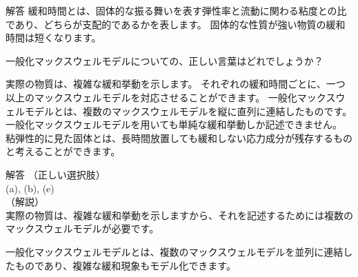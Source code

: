 \documentclass[uplatex,dvipdfmx,a4paper,11pt]{jsarticle}
\begin{document}
\begin{qlist}
\begin{itembox}[l]{解答}
			緩和時間とは、固体的な振る舞いを表す弾性率と流動に関わる粘度との比であり、どちらが支配的であるかを表します。
			固体的な性質が強い物質の緩和時間は短くなります。
        \end{itembox}
	\qitem 一般化マックスウェルモデルについての、正しい言葉はどれでしょうか？
		\begin{qlist2}
			\qitem 実際の物質は、複雑な緩和挙動を示します。
			\qitem それぞれの緩和時間ごとに、一つ以上のマックスウェルモデルを対応させることができます。
			\qitem 一般化マックスウェルモデルとは、複数のマックスウェルモデルを縦に直列に連結したものです。
			\qitem 一般化マックスウェルモデルを用いても単純な緩和挙動しか記述できません。
			\qitem 粘弾性的に見た固体とは、長時間放置しても緩和しない応力成分が残存するものと考えることができます。
		\end{qlist2}
		\vspace{3mm}
        \begin{itembox}[l]{解答}
            （正しい選択肢）\\
            (a), (b), (e)\\
            （解説）\\
            実際の物質は、複雑な緩和挙動を示しますから、それを記述するためには複数のマックスウェルモデルが必要です。
			
			一般化マックスウェルモデルとは、複数のマックスウェルモデルを並列に連結したものであり、複雑な緩和現象もモデル化できます。
        \end{itembox}
\end{qlist}
\end{document}
